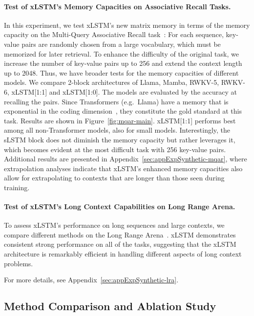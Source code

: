 \paragraph{Test of xLSTM's Memory Capacities on Associative Recall Tasks.} In this experiment, we test xLSTM's new matrix memory in terms of the memory capacity on the Multi-Query Associative Recall task~\citep{Arora:23arxiv}: For each sequence, key-value pairs are randomly chosen from a large vocabulary, which must be memorized for later retrieval. To enhance the difficulty of the original task, we increase the number of key-value pairs up to 256 and extend the context length up to 2048. Thus, we have broader tests for the memory capacities of different models. We compare 2-block architectures of Llama, Mamba, RWKV-5, RWKV-6, xLSTM[1:1] and xLSTM[1:0]. The models are evaluated by the accuracy at recalling the pairs. Since Transformers (e.g.\ Llama) have a memory that is exponential in the coding dimension~\citep{Ramsauer:21}, they constitute the gold standard at this task. Results are shown in Figure~\ref{fig:mqar-main}. 
xLSTM[1:1] performs best among all non-Transformer models, also for small models. Interestingly, the sLSTM block does not diminish the memory capacity but rather leverages it, which becomes evident at the most difficult task with 256 key-value pairs. Additional results are presented in Appendix~\ref{sec:appExpSynthetic-mqar},
where extrapolation analyses indicate that xLSTM's enhanced memory capacities also allow for extrapolating to contexts that are longer than those seen during training.

\paragraph{Test of xLSTM's Long Context Capabilities on Long Range Arena.} To assess xLSTM's performance on long sequences and large contexts, we compare different methods on the Long Range Arena~\citep{Tay:21}. xLSTM demonstrates consistent strong performance on all of the tasks, suggesting that the xLSTM architecture is remarkably efficient in handling different aspects of long context problems.

For more details, see Appendix~\ref{sec:appExpSynthetic-lra}.

\subsection{Method Comparison and Ablation Study}
\label{sec:ExpComparison}

